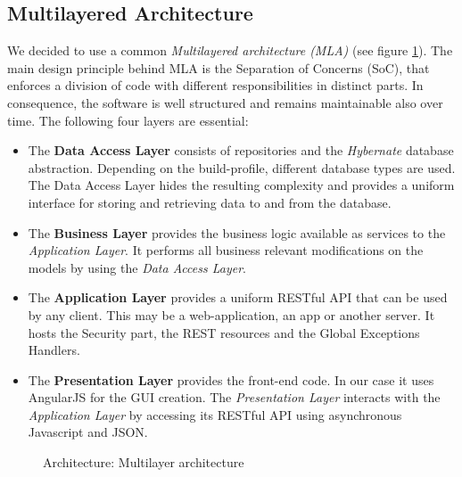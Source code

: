\subsection{Multilayered Architecture}
We decided to use a common \textit{Multilayered architecture (MLA)}\cite{mla} (see figure \ref{fig:architecture-layer}). The main design principle behind MLA is the Separation of Concerns (SoC), that enforces a division of code with different responsibilities in distinct parts. In consequence, the software is well structured and remains maintainable also over time. The following four layers are essential:
\begin{itemize}
	\item The \textbf{Data Access Layer} consists of repositories and the \textit{Hybernate} database abstraction. Depending on the build-profile, different database types are used. The Data Access Layer hides the resulting complexity and provides a uniform interface for storing and retrieving data to and from the database.
	\item The \textbf{Business Layer} provides the business logic available as services to the \textit{Application Layer}. It performs all business relevant modifications on the models by using the \textit{Data Access Layer}.	
	\item The \textbf{Application Layer} provides a uniform RESTful API that can be used by any client. This may be a web-application, an app or another server. It hosts the Security part, the REST resources and the Global Exceptions Handlers.
	\item The \textbf{Presentation Layer} provides the front-end code. In our case it uses AngularJS for the GUI creation. The \textit{Presentation Layer} interacts with the \textit{Application Layer} by accessing its RESTful API using asynchronous Javascript and JSON.
\end{itemize}

\begin{figure}[H]
	\centering
	\caption{Architecture: Multilayer architecture}
	\label{fig:architecture-layer}
\end{figure}

